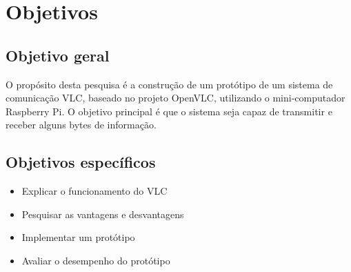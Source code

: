 \chapter{Objetivos}
\section{Objetivo geral}

O propósito desta pesquisa é a construção de um protótipo de um sistema de comunicação VLC, baseado no projeto OpenVLC, utilizando o mini-computador Raspberry Pi. O objetivo principal é que o sistema seja capaz de transmitir e receber alguns bytes de informação.

\section{Objetivos específicos}

\begin{itemize}

  \item Explicar o funcionamento do VLC
  \item Pesquisar as vantagens e desvantagens
  \item Implementar um protótipo
  \item Avaliar o desempenho do protótipo

\end{itemize}

